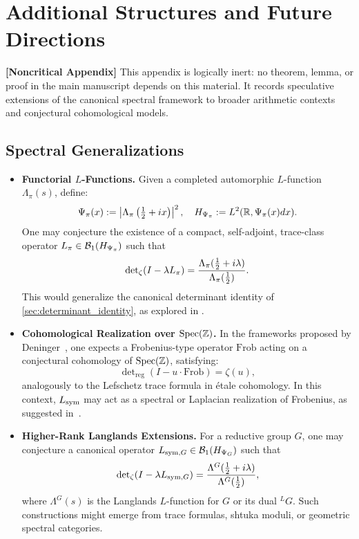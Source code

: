 \section{Additional Structures and Future Directions}
\label{app:additional_structures}

\noindent\textbf{[Noncritical Appendix]}  
This appendix is logically inert: no theorem, lemma, or proof in the main manuscript depends on this material. It records speculative extensions of the canonical spectral framework to broader arithmetic contexts and conjectural cohomological models.

\subsection*{Spectral Generalizations}

\begin{itemize}
  \item \textbf{Functorial \( L \)-Functions.}  
  Given a completed automorphic \( L \)-function \( \Lambda_\pi(s) \), define:
  \[
  \Psi_\pi(x) := \left| \Lambda_\pi\left( \tfrac{1}{2} + i x \right) \right|^2, \quad
  H_{\Psi_\pi} := L^2(\mathbb{R}, \Psi_\pi(x) dx).
  \]
  One may conjecture the existence of a compact, self-adjoint, trace-class operator \( L_\pi \in \mathcal{B}_1(H_{\Psi_\pi}) \) such that
  \[
  \det\nolimits_{\zeta}(I - \lambda L_\pi) = \frac{\Lambda_\pi(\tfrac{1}{2} + i\lambda)}{\Lambda_\pi(\tfrac{1}{2})}.
  \]
  This would generalize the canonical determinant identity of \cref{sec:determinant_identity}, as explored in .

  \item \textbf{Cohomological Realization over \( \operatorname{Spec}(\mathbb{Z}) \).}  
  In the frameworks proposed by Deninger~\cite{Deninger1998Frobenius}, one expects a Frobenius-type operator \( \mathrm{Frob} \) acting on a conjectural cohomology of \( \operatorname{Spec}(\mathbb{Z}) \), satisfying:
  \[
  \det\nolimits_{\mathrm{reg}}(I - u \cdot \mathrm{Frob}) = \zeta(u),
  \]
  analogously to the Lefschetz trace formula in étale cohomology. In this context, \( L_{\mathrm{sym}} \) may act as a spectral or Laplacian realization of Frobenius, as suggested in~\cite{Connes1999TraceFormula}.

  \item \textbf{Higher-Rank Langlands Extensions.}  
  For a reductive group \( G \), one may conjecture a canonical operator \( L_{\mathrm{sym},G} \in \mathcal{B}_1(H_{\Psi_G}) \) such that
  \[
  \det\nolimits_{\zeta}(I - \lambda L_{\mathrm{sym},G}) = \frac{\Lambda^G(\tfrac{1}{2} + i\lambda)}{\Lambda^G(\tfrac{1}{2})},
  \]
  where \( \Lambda^G(s) \) is the Langlands \( L \)-function for \( G \) or its dual \( {}^LG \). Such constructions might emerge from trace formulas, shtuka moduli, or geometric spectral categories.
\end{itemize}

